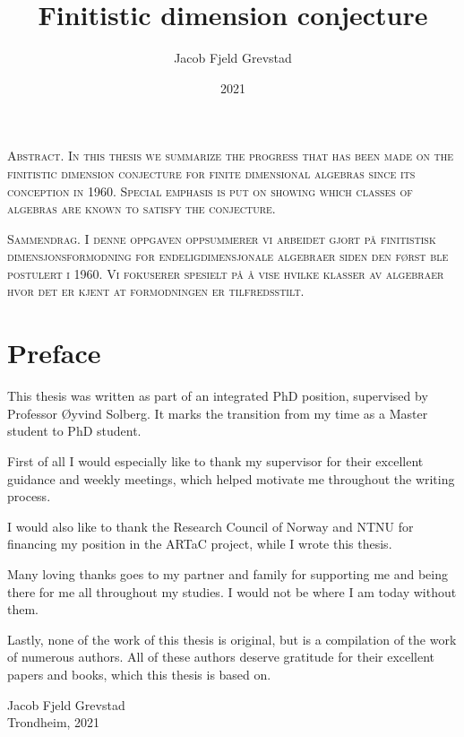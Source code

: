 \documentclass[11pt, english, twoside]{article}
\theoremstyle{definition}
\begin{document}
\title{Finitistic dimension conjecture}
\author{Jacob Fjeld Grevstad}
\date{2021}
{}

%
\noindent \scshape\mdseries Abstract. \normalfont
In this thesis we summarize the progress that has been made on the finitistic dimension conjecture for finite dimensional algebras since its conception in 1960. Special emphasis is put on showing which classes of algebras are known to satisfy the conjecture.

\noindent \scshape\mdseries Sammendrag. \normalfont
I denne oppgaven oppsummerer vi arbeidet gjort på finitistisk dimensjonsformodning for endeligdimensjonale algebraer siden den først ble postulert i 1960. Vi fokuserer spesielt på å vise hvilke klasser av algebraer hvor det er kjent at formodningen er tilfredsstilt.
\clearpage

\section*{Preface}
%
This thesis was written as part of an integrated PhD position, supervised by Professor Øyvind Solberg. It marks the transition from my time as a Master student to PhD student.

First of all I would especially like to thank my supervisor for their excellent guidance and weekly meetings, which helped motivate me throughout the writing process. 

I would also like to thank the Research Council of Norway and NTNU for financing my position in the ARTaC project, while I wrote this thesis.

Many loving thanks goes to my partner and family for supporting me and being there for me all throughout my studies. I would not be where I am today without them.

Lastly, none of the work of this thesis is original, but is a compilation of the work of numerous authors. All of these authors deserve gratitude for their excellent papers and books, which this thesis is based on. 
\begin{flushright}
	Jacob Fjeld Grevstad\\ 
	Trondheim, 2021
\end{flushright}
\clearpage

\tableofcontents
\clearpage
\end{document}
